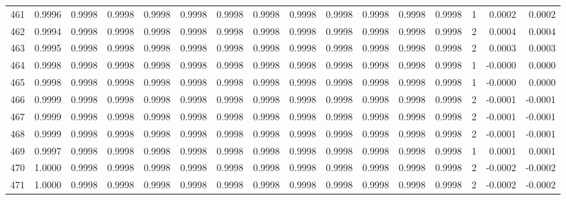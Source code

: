\begin{tabular}{lrrrrrrrrrrrrrrr}
461 &      0.9996 &  0.9998 &  0.9998 &  0.9998 &  0.9998 &  0.9998 &  0.9998 &  0.9998 &  0.9998 &  0.9998 &   0.9998 &     0.9998 &      1 &                    0.0002 &                     0.0002 \\
462 &      0.9994 &  0.9998 &  0.9998 &  0.9998 &  0.9998 &  0.9998 &  0.9998 &  0.9998 &  0.9998 &  0.9998 &   0.9998 &     0.9998 &      2 &                    0.0004 &                     0.0004 \\
463 &      0.9995 &  0.9998 &  0.9998 &  0.9998 &  0.9998 &  0.9998 &  0.9998 &  0.9998 &  0.9998 &  0.9998 &   0.9998 &     0.9998 &      2 &                    0.0003 &                     0.0003 \\
464 &      0.9998 &  0.9998 &  0.9998 &  0.9998 &  0.9998 &  0.9998 &  0.9998 &  0.9998 &  0.9998 &  0.9998 &   0.9998 &     0.9998 &      1 &                   -0.0000 &                     0.0000 \\
465 &      0.9998 &  0.9998 &  0.9998 &  0.9998 &  0.9998 &  0.9998 &  0.9998 &  0.9998 &  0.9998 &  0.9998 &   0.9998 &     0.9998 &      1 &                   -0.0000 &                     0.0000 \\
466 &      0.9999 &  0.9998 &  0.9998 &  0.9998 &  0.9998 &  0.9998 &  0.9998 &  0.9998 &  0.9998 &  0.9998 &   0.9998 &     0.9998 &      2 &                   -0.0001 &                    -0.0001 \\
467 &      0.9999 &  0.9998 &  0.9998 &  0.9998 &  0.9998 &  0.9998 &  0.9998 &  0.9998 &  0.9998 &  0.9998 &   0.9998 &     0.9998 &      2 &                   -0.0001 &                    -0.0001 \\
468 &      0.9999 &  0.9998 &  0.9998 &  0.9998 &  0.9998 &  0.9998 &  0.9998 &  0.9998 &  0.9998 &  0.9998 &   0.9998 &     0.9998 &      2 &                   -0.0001 &                    -0.0001 \\
469 &      0.9997 &  0.9998 &  0.9998 &  0.9998 &  0.9998 &  0.9998 &  0.9998 &  0.9998 &  0.9998 &  0.9998 &   0.9998 &     0.9998 &      1 &                    0.0001 &                     0.0001 \\
470 &      1.0000 &  0.9998 &  0.9998 &  0.9998 &  0.9998 &  0.9998 &  0.9998 &  0.9998 &  0.9998 &  0.9998 &   0.9998 &     0.9998 &      2 &                   -0.0002 &                    -0.0002 \\
471 &      1.0000 &  0.9998 &  0.9998 &  0.9998 &  0.9998 &  0.9998 &  0.9998 &  0.9998 &  0.9998 &  0.9998 &   0.9998 &     0.9998 &      2 &                   -0.0002 &                    -0.0002 \\

\end{tabular}
